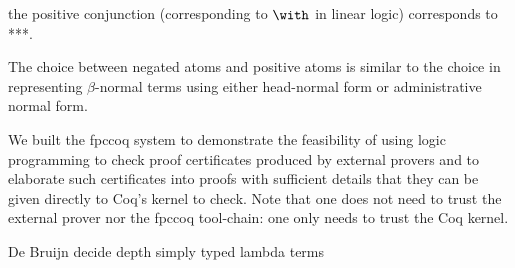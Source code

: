 the positive conjunction (corresponding to $\with$ in linear logic)
corresponds to ***.

The choice between negated atoms and positive atoms is similar to the
choice in representing $\beta$-normal terms using either head-normal
form or administrative normal form.



We built the fpccoq system to demonstrate the feasibility of using
logic programming to check proof certificates produced by external
provers and to elaborate such certificates into proofs with sufficient
details that they can be given directly to Coq's kernel to
check.  Note that one does not need to trust the external prover nor
the fpccoq tool-chain: one only needs to trust the Coq kernel.


De Bruijn
decide depth
simply typed lambda terms


\newpage

